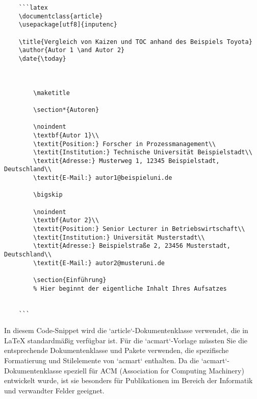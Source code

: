 \begin{verbatim}
	```latex
	\documentclass{article}
	\usepackage[utf8]{inputenc}
	
	\title{Vergleich von Kaizen und TOC anhand des Beispiels Toyota}
	\author{Autor 1 \and Autor 2}
	\date{\today}
	
	
		
		\maketitle
		
		\section*{Autoren}
		
		\noindent
		\textbf{Autor 1}\\
		\textit{Position:} Forscher in Prozessmanagement\\
		\textit{Institution:} Technische Universität Beispielstadt\\
		\textit{Adresse:} Musterweg 1, 12345 Beispielstadt, Deutschland\\
		\textit{E-Mail:} autor1@beispieluni.de
		
		\bigskip
		
		\noindent
		\textbf{Autor 2}\\
		\textit{Position:} Senior Lecturer in Betriebswirtschaft\\
		\textit{Institution:} Universität Musterstadt\\
		\textit{Adresse:} Beispielstraße 2, 23456 Musterstadt, Deutschland\\
		\textit{E-Mail:} autor2@musteruni.de
		
		\section{Einführung}
		% Hier beginnt der eigentliche Inhalt Ihres Aufsatzes
		
	
	```
\end{verbatim}

In diesem Code-Snippet wird die `article`-Dokumentenklasse verwendet, die in LaTeX standardmäßig verfügbar ist. Für die `acmart`-Vorlage müssten Sie die entsprechende Dokumentenklasse und Pakete verwenden, die spezifische Formatierung und Stilelemente von `acmart` enthalten. Da die `acmart`-Dokumentenklasse speziell für ACM (Association for Computing Machinery) entwickelt wurde, ist sie besonders für Publikationen im Bereich der Informatik und verwandter Felder geeignet. 

